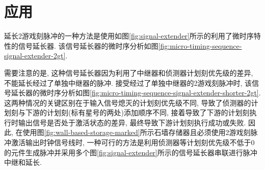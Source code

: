 \documentclass[UTF8,12pt,punct=kaiming,fontset=none]{ctexart}
\begin{document}
\section{应用}
延长2游戏刻脉冲的一种方法是使用如图\ref{fig:signal-extender}所示的利用了微时序特性的信号延长器. 该信号延长器的微时序分析如图\ref{fig:micro-timing-sequence-signal-extender-2gt}.

需要注意的是, 这种信号延长器因为利用了中继器和侦测器计划刻优先级的差异, 不能延长经过了单独中继器的脉冲. 接受经过了单独中继器的2游戏刻脉冲时, 该信号延长器的微时序分析如图\ref{fig:micro-timing-sequence-signal-extender-shorter-2gt}. 这两种情况的关键区别在于输入信号熄灭的计划刻优先级不同, 导致了侦测器的计划刻与下游的计划刻(标有星号的两处)添加顺序不同, 接着导致了下游的计划刻执行时输出信号是否处于激活状态的差异, 最终导致下游计划刻执行成功或失败. 因此, 在使用图\ref{fig:wall-based-storage-marked}所示石墙存储器且必须使用2游戏刻脉冲激活输出时钟信号线时, 一种可行的方法是利用侦测器等计划刻优先级不低于0的元件生成脉冲并采用多个图\ref{fig:signal-extender}所示的信号延长器串联进行脉冲中继和延长.
\end{document}
